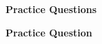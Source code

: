 \documentclass[11pt,fleqn,oneside]{book}
\begin{document}
\appendix
\thispagestyle{empty}
\chapter[Practice Questions]{}
\thispagestyle{empty}
\vspace{3cm}
\begin{center}
{\Huge \bf Practice Questions}
\end{center}

\newpage


\newpage

\setcounter{page}{1}
\normalsize
\begin{center}
{ \Huge \bf Practice Question}
\end{center}
\normalsize
\begin{enumerate}


\end{enumerate}
\end{document}
